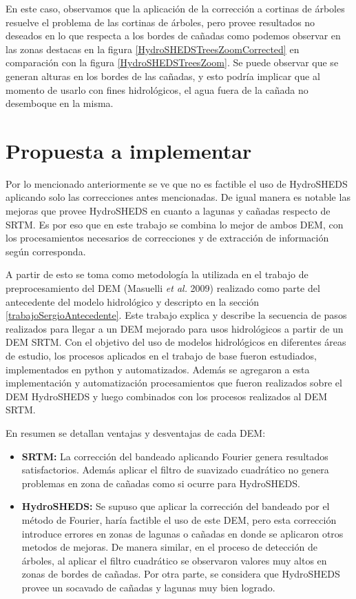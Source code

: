 \documentclass[10pt,a4paper, twoside]{report}
\begin{document}
En este caso, observamos que la aplicación de la corrección a cortinas de árboles resuelve el problema de las cortinas de árboles, pero provee resultados no deseados en lo que respecta a los bordes de cañadas como podemos observar en las zonas destacas en la figura \ref{HydroSHEDSTreesZoomCorrected} en comparación con la figura \ref{HydroSHEDSTreesZoom}. Se puede observar que se generan alturas en los bordes de las cañadas, y esto podría implicar que al momento de usarlo con fines hidrológicos, el agua fuera de la cañada no desemboque en la misma. 



\section{Propuesta a implementar}

Por lo mencionado anteriormente se ve que no es factible el uso de HydroSHEDS aplicando solo las correcciones antes mencionadas. De igual manera es notable las mejoras que provee HydroSHEDS en cuanto a lagunas y cañadas respecto de SRTM. Es por eso que en este trabajo se combina lo mejor de ambos DEM, con los procesamientos necesarios de correcciones y de extracción de información según corresponda.

A partir de esto se toma como metodología la utilizada en el trabajo de preprocesamiento del DEM (Masuelli \textit{et al.} 2009) realizado como parte del antecedente del modelo hidrológico y descripto en la sección \ref{trabajoSergioAntecedente}. Este trabajo explica y describe la secuencia de pasos realizados para llegar a un DEM mejorado para usos hidrológicos a partir de un DEM SRTM. Con el objetivo del uso de modelos hidrológicos en diferentes áreas de estudio, los procesos aplicados en el trabajo de base fueron estudiados, implementados en python y automatizados. Además se agregaron a esta implementación y automatización procesamientos que fueron realizados sobre el DEM HydroSHEDS y luego combinados con los procesos realizados al DEM SRTM.


En resumen se detallan ventajas y desventajas de cada DEM:

\begin{itemize}
	\item \textbf{SRTM:} La corrección del bandeado aplicando Fourier genera resultados satisfactorios. Además aplicar el filtro de suavizado cuadrático no genera problemas en zona de cañadas como si ocurre para HydroSHEDS.
	\item \textbf{HydroSHEDS:} Se supuso que aplicar la corrección del bandeado por el método de Fourier, haría factible el uso de este DEM, pero esta corrección introduce errores en zonas de lagunas o cañadas en donde se aplicaron otros metodos de mejoras. De manera similar, en el proceso de detección de árboles, al aplicar el filtro cuadrático se observaron valores muy altos en zonas de bordes de cañadas. Por otra parte, se considera que HydroSHEDS provee un socavado de cañadas y lagunas muy bien logrado.	
\end{itemize}
\end{document}
